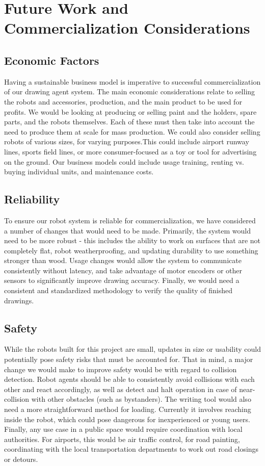 \section{Future Work and Commercialization Considerations}
\label{sec:future_work}

\subsection{Economic Factors}
Having a sustainable business model is imperative to successful commercialization of our drawing agent system. The main economic considerations relate to selling the robots and accessories, production, and the main product to be used for profits. We would be looking at producing or selling paint and the holders, spare parts, and the robots themselves. Each of these must then take into account the need to produce them at scale for mass production. We could also consider selling robots of various sizes, for varying purposes.This could include airport runway lines, sports field lines, or more consumer-focused as a toy or tool for advertising on the ground. Our business models could include usage training, renting vs. buying individual units, and maintenance costs.

\subsection{Reliability}
To ensure our robot system is reliable for commercialization, we have considered a number of changes that would need to be made. Primarily, the system would need to be more robust - this includes the ability to work on surfaces that are not completely flat, robot weatherproofing, and updating durability to use something stronger than wood. Usage changes would allow the system to communicate consistently without latency, and take advantage of motor encoders or other sensors to significantly improve drawing accuracy. Finally, we would need a consistent and standardized methodology to verify the quality of finished drawings.

\subsection{Safety}
While the robots built for this project are small, updates in size or usability could potentially pose safety risks that must be accounted for. That in mind, a major change we would make to improve safety would be with regard to collision detection. Robot agents should be able to consistently avoid collisions with each other and react accordingly, as well as detect and halt operation in case of near-collision with other obstacles (such as bystanders). The writing tool would also need a more straightforward method for loading. Currently it involves reaching inside the robot, which could pose dangerous for inexperienced or young users. Finally, any use case in a public space would require coordination with local authorities. For airports, this would be air traffic control, for road painting, coordinating with the local transportation departments to work out road closings or detours.


